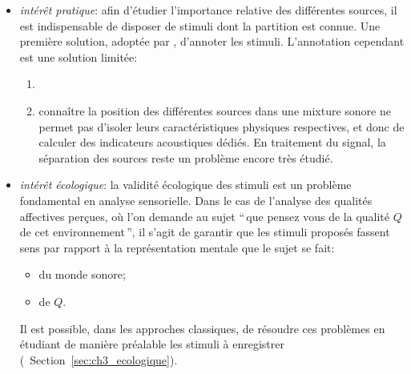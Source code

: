 \begin{itemize}
\item \emph{intérêt pratique}: afin d'étudier l'importance relative des différentes sources, il est indispensable de disposer de stimuli dont la partition est connue. Une première solution,  adoptée par \citep{lavandier2006contribution},   d'annoter les stimuli. L'annotation cependant est une solution limitée: 
\begin{enumerate}
\item {} 
\item connaître la position des différentes sources dans une mixture sonore ne permet pas d'isoler leurs caractéristiques physiques respectives, et donc de calculer des indicateurs acoustiques dédiés. En traitement du signal, la séparation des sources reste un problème encore très étudié.
\end{enumerate}


\item \emph{intérêt écologique}: la validité écologique des stimuli est un problème fondamental en analyse sensorielle. Dans le cas de l'analyse des qualités affectives perçues, où l'on demande  au sujet ``\,que pensez vous de la qualité $Q$ de cet environnement\,'', il s'agit de garantir que les stimuli proposés fassent sens par rapport à la représentation mentale que le sujet se fait: 
\begin{itemize}
\item  du monde sonore; 
\item  de $Q$. 
\end{itemize}

Il est possible, dans les approches classiques, de résoudre ces problèmes en étudiant de manière préalable les stimuli à enregistrer (\cf~Section~\ref{sec:ch3_ecologique}).  


\end{itemize}
